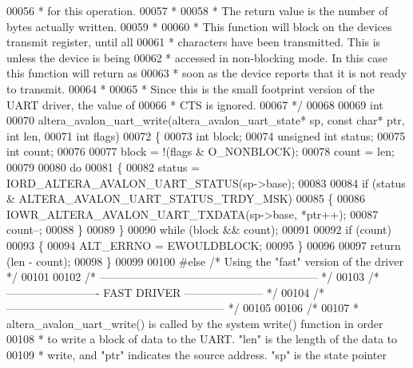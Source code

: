 \begin{DoxyCode}
00056 \textcolor{comment}{ * for this operation.}
00057 \textcolor{comment}{ *}
00058 \textcolor{comment}{ * The return value is the number of bytes actually written.}
00059 \textcolor{comment}{ *}
00060 \textcolor{comment}{ * This function will block on the devices transmit register, until all }
00061 \textcolor{comment}{ * characters have been transmitted. This is unless the device is being }
00062 \textcolor{comment}{ * accessed in non-blocking mode. In this case this function will return as }
00063 \textcolor{comment}{ * soon as the device reports that it is not ready to transmit.}
00064 \textcolor{comment}{ *}
00065 \textcolor{comment}{ * Since this is the small footprint version of the UART driver, the value of }
00066 \textcolor{comment}{ * CTS is ignored.}
00067 \textcolor{comment}{ */}
00068 
00069 \textcolor{keywordtype}{int} 
00070 altera_avalon_uart_write(altera_avalon_uart_state* sp, \textcolor{keyword}{const} \textcolor{keywordtype}{char}* ptr, \textcolor{keywordtype}{int} len,
00071   \textcolor{keywordtype}{int} flags)
00072 \{
00073   \textcolor{keywordtype}{int} block;
00074   \textcolor{keywordtype}{unsigned} \textcolor{keywordtype}{int} status;
00075   \textcolor{keywordtype}{int} count;
00076 
00077   block = !(flags & O\_NONBLOCK);
00078   count = len;
00079 
00080   \textcolor{keywordflow}{do}
00081   \{
00082     status = IORD_ALTERA_AVALON_UART_STATUS(sp->base);
00083    
00084     \textcolor{keywordflow}{if} (status & ALTERA_AVALON_UART_STATUS_TRDY_MSK)
00085     \{
00086       IOWR_ALTERA_AVALON_UART_TXDATA(sp->base, *ptr++);
00087       count--;
00088     \}
00089   \}
00090   \textcolor{keywordflow}{while} (block && count);
00091 
00092   \textcolor{keywordflow}{if} (count)
00093   \{
00094     ALT_ERRNO = EWOULDBLOCK;
00095   \}
00096 
00097   \textcolor{keywordflow}{return} (len - count);
00098 \}
00099 
00100 \textcolor{preprocessor}{#else }\textcolor{comment}{/* Using the "fast" version of the driver */}\textcolor{preprocessor}{}
00101 
00102 \textcolor{comment}{/* ----------------------------------------------------------- */}
00103 \textcolor{comment}{/* ------------------------- FAST DRIVER --------------------- */}
00104 \textcolor{comment}{/* ----------------------------------------------------------- */}
00105 
00106 \textcolor{comment}{/*}
00107 \textcolor{comment}{ * altera\_avalon\_uart\_write() is called by the system write() function in order}
00108 \textcolor{comment}{ * to write a block of data to the UART. "len" is the length of the data to }
00109 \textcolor{comment}{ * write, and "ptr" indicates the source address. "sp" is the state pointer}

\end{DoxyCode}
